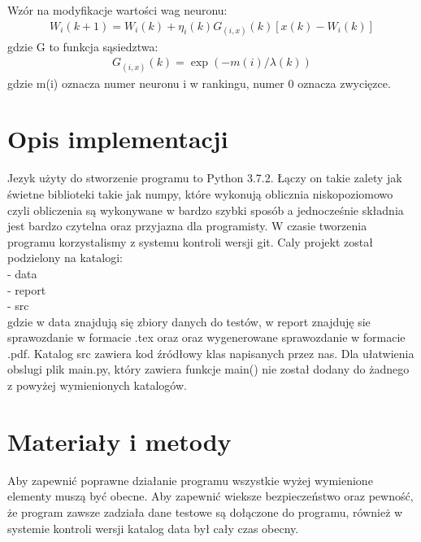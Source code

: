 \documentclass{classrep}
\begin{document}
{Wzór na modyfikacje wartości wag neuronu:
\begin{align*}
W_i(k+1)=W_i(k)+\eta_i(k)G_{(i,x)}(k)[x(k)-W_i(k)]
\end{align*}
gdzie G to funkcja sąsiedztwa:
\begin{align*}
G_{(i,x)}(k)=\exp(-m(i)/\lambda(k))
\end{align*}
gdzie m(i) oznacza numer neuronu i w rankingu, numer 0 oznacza zwycięzce.\\

}

\section{Opis implementacji}
{Jezyk użyty do stworzenie programu to Python 3.7.2. Łączy on takie zalety jak świetne biblioteki takie jak numpy, które wykonują oblicznia niskopoziomowo czyli obliczenia są wykonywane w bardzo szybki sposób a jednocześnie składnia jest bardzo czytelna oraz przyjazna dla programisty. W czasie tworzenia programu korzystalismy z systemu kontroli wersji git. Caly projekt został podzielony na katalogi:\\
- data\\
- report\\
- src\\
gdzie w data znajdują się zbiory danych do testów, w report znajduję sie sprawozdanie w formacie .tex oraz oraz wygenerowane sprawozdanie w formacie .pdf. Katalog src zawiera kod źródłowy klas napisanych przez nas. Dla ułatwienia obslugi plik main.py, który zawiera funkcje main() nie został dodany do żadnego z powyżej wymienionych katalogów.
}

\section{Materiały i metody}
{Aby zapewnić poprawne działanie programu wszystkie wyżej wymienione elementy muszą być obecne. Aby zapewnić wieksze bezpieczeństwo oraz pewność, że program zawsze zadziała dane testowe są dołączone do programu, również w systemie kontroli wersji katalog data był cały czas obecny. 
}
\end{document}
